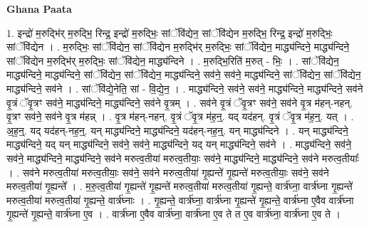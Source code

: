 \documentclass[17pt]{extarticle}
\begin{document}
\textbf{Ghana Paata } \newline

1. इन्द्रो॑ म॒रुद्भि॑र् म॒रुद्भि॒ रिन्द्र॒ इन्द्रो॑ म॒रुद्भिः॒ सांॅवि॑द्येन॒ सांॅवि॑द्येन म॒रुद्भि॒ रिन्द्र॒ इन्द्रो॑ म॒रुद्भिः॒ सांॅवि॑द्येन । . म॒रुद्भिः॒ सांॅवि॑द्येन॒ सांॅवि॑द्येन म॒रुद्भि॑र् म॒रुद्भिः॒ सांॅवि॑द्येन॒ माद्ध्य॑न्दिने॒ माद्ध्य॑न्दिने॒ सांॅवि॑द्येन म॒रुद्भि॑र् म॒रुद्भिः॒ सांॅवि॑द्येन॒ माद्ध्य॑न्दिने । . म॒रुद्भि॒रिति॑ म॒रुत् - भिः॒ । . सांॅवि॑द्येन॒ माद्ध्य॑न्दिने॒ माद्ध्य॑न्दिने॒ सांॅवि॑द्येन॒ सांॅवि॑द्येन॒ माद्ध्य॑न्दिने॒ सव॑ने॒ सव॑ने॒ माद्ध्य॑न्दिने॒ सांॅवि॑द्येन॒ सांॅवि॑द्येन॒ माद्ध्य॑न्दिने॒ सव॑ने । . सांॅवि॑द्ये॒नेति॒ सां - वि॒द्ये॒न॒ । . माद्ध्य॑न्दिने॒ सव॑ने॒ सव॑ने॒ माद्ध्य॑न्दिने॒ माद्ध्य॑न्दिने॒ सव॑ने वृ॒त्रं ॅवृ॒त्रꣳ सव॑ने॒ माद्ध्य॑न्दिने॒ माद्ध्य॑न्दिने॒ सव॑ने वृ॒त्रम् । . सव॑ने वृ॒त्रं ॅवृ॒त्रꣳ सव॑ने॒ सव॑ने वृ॒त्र म॑हन्-नहन्. वृ॒त्रꣳ सव॑ने॒ सव॑ने वृ॒त्र म॑हन्न् । . वृ॒त्र म॑हन्-नहन्. वृ॒त्रं ॅवृ॒त्र म॑ह॒न्॒. यद् यद॑हन्. वृ॒त्रं ॅवृ॒त्र म॑ह॒न्॒. यत् । . अ॒ह॒न्॒. यद् यद॑हन्-नह॒न्॒. यन् माद्ध्य॑न्दिने॒ माद्ध्य॑न्दिने॒ यद॑हन्-नह॒न्॒. यन् माद्ध्य॑न्दिने । . यन् माद्ध्य॑न्दिने॒ माद्ध्य॑न्दिने॒ यद् यन् माद्ध्य॑न्दिने॒ सव॑ने॒ सव॑ने॒ माद्ध्य॑न्दिने॒ यद् यन् माद्ध्य॑न्दिने॒ सव॑ने । . माद्ध्य॑न्दिने॒ सव॑ने॒ सव॑ने॒ माद्ध्य॑न्दिने॒ माद्ध्य॑न्दिने॒ सव॑ने मरुत्व॒तीया॑ मरुत्व॒तीयाः॒ सव॑ने॒ माद्ध्य॑न्दिने॒ माद्ध्य॑न्दिने॒ सव॑ने मरुत्व॒तीयाः᳚ । . सव॑ने मरुत्व॒तीया॑ मरुत्व॒तीयाः॒ सव॑ने॒ सव॑ने मरुत्व॒तीया॑ गृ॒ह्यन्ते॑ गृ॒ह्यन्ते॑ मरुत्व॒तीयाः॒ सव॑ने॒ सव॑ने मरुत्व॒तीया॑ गृ॒ह्यन्ते᳚ । . म॒रु॒त्व॒तीया॑ गृ॒ह्यन्ते॑ गृ॒ह्यन्ते॑ मरुत्व॒तीया॑ मरुत्व॒तीया॑ गृ॒ह्यन्ते॒ वार्त्र॑घ्ना॒ वार्त्र॑घ्ना गृ॒ह्यन्ते॑ मरुत्व॒तीया॑ मरुत्व॒तीया॑ गृ॒ह्यन्ते॒ वार्त्र॑घ्नाः । . गृ॒ह्यन्ते॒ वार्त्र॑घ्ना॒ वार्त्र॑घ्ना गृ॒ह्यन्ते॑ गृ॒ह्यन्ते॒ वार्त्र॑घ्ना ए॒वैव वार्त्र॑घ्ना गृ॒ह्यन्ते॑ गृ॒ह्यन्ते॒ वार्त्र॑घ्ना ए॒व । . वार्त्र॑घ्ना ए॒वैव वार्त्र॑घ्ना॒ वार्त्र॑घ्ना ए॒व ते त ए॒व वार्त्र॑घ्ना॒ वार्त्र॑घ्ना ए॒व ते । \newline
\end{document}
